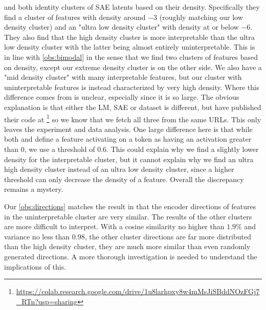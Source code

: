 \textcite{bricken_towards_2023} and \textcite{nanda_open_2023} both identity clusters of \ac{SAE} latents based on their density.
Specifically they find a cluster of features with density around $-3$ (roughly matching our low density cluster) and an "ultra low density cluster" with density at or below $-6$.
They also find that the high density cluster is more interpretable than the ultra low density cluster with the latter being almost entirely uninterpretable.
This is in line with \ref{obs:bimodal} in the sense that we find two clusters of features based on density, except our extreme density cluster is on the other side.
We also have a "mid density cluster" with many interpretable features, but our cluster with uninterpretable features is instead characterized by very high density.
Where this difference comes from is unclear, especially since it is so large.
The obvious explanation is that either the \ac{LM}, \ac{SAE} or dataset is different, but \textcite{nanda_open_2023} have published their code at \footnote{\url{https://colab.research.google.com/drive/1u8larhpxy8w4mMsJiSBddNOzFGj7_RTn?usp=sharing}} so we know that we fetch all three from the same URLs.
This only leaves the experiment and data analysis.
One large difference here is that while both \textcite{bricken_towards_2023} and \textcite{nanda_open_2023} define a feature activating on a token as having an activation greater than $0$, we use a threshold of $0.6$.
This could explain why we find a slightly lower density for the interpretable cluster, but it cannot explain why we find an ultra high density cluster instead of an ultra low density cluster, since a higher threshold can only decrease the density of a feature.
Overall the discrepancy remains a mystery.

Our \ref{obs:directions} matches the result in \textcite{nanda_open_2023} that the encoder directions of features in the uninterpretable cluster are very similar.
The results of the other clusters are more difficult to interpret.
With a cosine similarity no higher than $1.9\%$ and variance no less than $0.98$, the other cluster directions are far more distributed than the high density cluster, they are much more similar than even randomly generated directions.
A more thorough investigation is needed to understand the implications of this.


